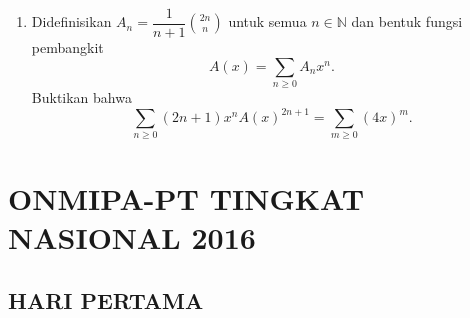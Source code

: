 \documentclass[12pt,twoside]{article}
\begin{document}
\begin{enumerate}
\begin{enumerate}
          \end{enumerate}

    \item Didefinisikan $\displaystyle A_n=\dfrac{1}{n+1}\binom{2n}{n}$ untuk semua $n\in\mathbb{N}$ dan bentuk fungsi pembangkit
          $$A(x)=\sum_{n\geq 0}A_nx^n.$$
          Buktikan bahwa
          $$\sum_{n\geq 0}(2n+1)x^nA(x)^{2n+1}=\sum_{m\geq 0}(4x)^m.$$
\end{enumerate}
\newpage
{}
\section{ONMIPA-PT TINGKAT NASIONAL 2016}
\subsection{HARI PERTAMA}
\end{document}
